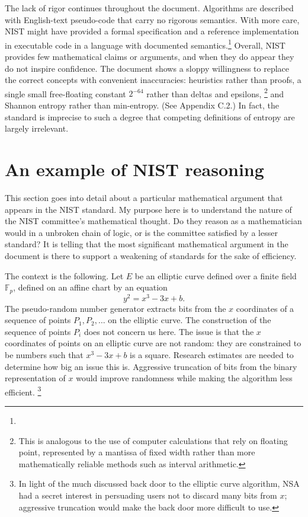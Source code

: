 \documentclass[11pt]{amsart} %
\newcommand{\ring}[1]{\mathbb{#1}}
\begin{document}
The lack of rigor continues throughout the document.  Algorithms are described with English-text
pseudo-code that carry no rigorous semantics.  With more care,  NIST might
have provided a formal specification and a reference implementation in executable code in a language
with documented semantics.\footnote{}
Overall, NIST provides few mathematical claims or arguments,
and when they do appear they do not inspire confidence.   The document shows a sloppy  willingness
to replace the correct concepts with  convenient inaccuracies:  
heuristics rather than proofs, a single small free-floating constant $2^{-64}$ rather than deltas and epsilons,%
\footnote{This is analogous to the use of
 computer calculations that rely on floating point, represented by a mantissa of
fixed width rather than more mathematically reliable methods such as interval arithmetic.}
and Shannon entropy rather than min-entropy.  (See Appendix C.2.)
In fact, the standard is imprecise to such a degree that competing definitions of entropy are largely irrelevant.

\section{An example of NIST reasoning}

This section goes into detail about a particular mathematical argument that appears in the
NIST standard.  My purpose here is to understand the nature of the NIST committee's mathematical
thought.  Do they reason as a mathematician would in a unbroken chain of logic, or is the committee
satisfied by a lesser standard? 
It is telling that
the most significant mathematical argument in the document is there to support a weakening
of standards for the sake of efficiency.

The context is the following.  Let $E$ be an elliptic curve defined over a finite field $\ring{F}_p$,
defined on an affine chart by an equation
\[
y^2 = x^3 - 3 x + b.
\]
The pseudo-random number generator extracts bits from the
 $x$ coordinates of a sequence of points $P_1, P_2,\ldots $ 
on the elliptic curve.  The construction of the sequence of points $P_i$ does not concern us here.
The issue is that the $x$ coordinates of points on an elliptic curve are not random: they
are constrained to be numbers such that $x^3 - 3 x + b$ is a square.  Research estimates are needed to
determine how big an issue this is.   Aggressive truncation of bits from the binary representation of $x$ would improve randomness
while making the algorithm less efficient.%
\footnote{In light of the much discussed back door to the elliptic curve algorithm, NSA had a secret interest
in persuading users not to discard many bits from  $x$; aggressive truncation would
make the back door more difficult to use.}
\end{document}
